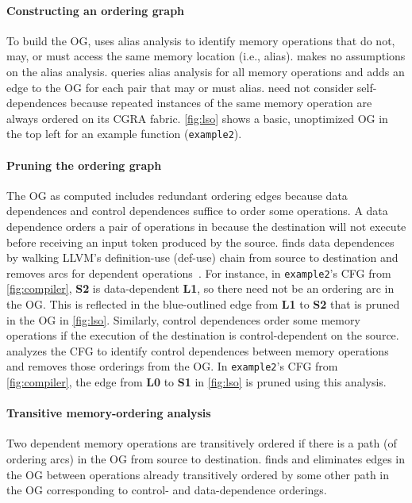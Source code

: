 \paragraph{Constructing an ordering graph} 
To build the OG, \riptidecomp uses alias analysis to identify memory operations
that do not, may, or must access the same memory location (i.e., alias).
%
\riptidecomp makes no assumptions on the alias analysis.
%
\riptide queries alias analysis for all memory operations and adds
an edge to the OG for each pair that may or must alias.
%
\riptidecomp need not consider self-dependences because repeated instances of the
same memory operation are always ordered on its CGRA fabric. %
%
\autoref{fig:lso} shows a basic, unoptimized OG in the top left for an 
example function (\texttt{example2}).

\paragraph{Pruning the ordering graph} The OG as computed includes redundant
ordering edges because data dependences and control dependences suffice to
order some operations.
%
A data dependence orders a pair of operations in \riptide 
because the destination will not execute before receiving an input token 
produced by the source.
% 
\riptidecomp finds data dependences by walking LLVM's definition-use (def-use)
chain from source to destination and removes arcs for dependent operations~\cite{nachos}.
%
For instance, in \texttt{example2}'s CFG from \autoref{fig:compiler}, 
\textbf{S2} is data-dependent \textbf{L1}, so there need not
be an ordering arc in the OG. This is reflected in the blue-outlined edge
from \textbf{L1} to \textbf{S2} that is pruned in the OG in \autoref{fig:lso}.
%
Similarly, control dependences order some memory operations if the execution of
the destination is control-dependent on the source.
%
\riptidecomp analyzes the CFG to identify control dependences
between memory operations and removes those orderings from the OG.
%
In \texttt{example2}'s CFG from \autoref{fig:compiler}, the
edge from \textbf{L0} to \textbf{S1} in \autoref{fig:lso} is pruned using this analysis.

\paragraph{Transitive memory-ordering analysis}
% 
Two dependent memory operations are transitively ordered if there is a path (of
ordering arcs) in the OG from source to destination.
%
\riptidecomp finds and eliminates edges in the OG between operations already
transitively ordered by some other path in the OG corresponding to control- and
data-dependence orderings.
%

